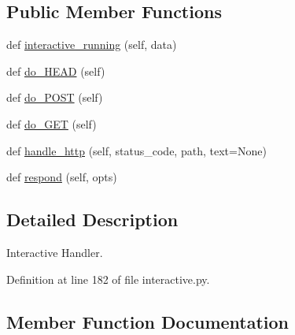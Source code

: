 \subsection*{Public Member Functions}
\begin{DoxyCompactItemize}
\item 
def \hyperlink{classprojects_1_1personality__captions_1_1interactive_1_1MyHandler_ae58a0c4c564f54a29ff85afa26086e47}{interactive\+\_\+running} (self, data)
\item 
def \hyperlink{classprojects_1_1personality__captions_1_1interactive_1_1MyHandler_a51c600da08cf2f01d860f4a4c500e827}{do\+\_\+\+H\+E\+AD} (self)
\item 
def \hyperlink{classprojects_1_1personality__captions_1_1interactive_1_1MyHandler_a846c973c3c91308218b79f84396265ac}{do\+\_\+\+P\+O\+ST} (self)
\item 
def \hyperlink{classprojects_1_1personality__captions_1_1interactive_1_1MyHandler_a52eec9579c85ca0497df9cbe773f729c}{do\+\_\+\+G\+ET} (self)
\item 
def \hyperlink{classprojects_1_1personality__captions_1_1interactive_1_1MyHandler_aa0900ea1f19ecd9cd9bf0ae93ce1028e}{handle\+\_\+http} (self, status\+\_\+code, path, text=None)
\item 
def \hyperlink{classprojects_1_1personality__captions_1_1interactive_1_1MyHandler_a990c770086f0596dde94fc2a84e76d90}{respond} (self, opts)
\end{DoxyCompactItemize}


\subsection{Detailed Description}
\begin{DoxyVerb}Interactive Handler.
\end{DoxyVerb}
 

Definition at line 182 of file interactive.\+py.



\subsection{Member Function Documentation}
\mbox{\label{classprojects_1_1personality__captions_1_1interactive_1_1MyHandler_a52eec9579c85ca0497df9cbe773f729c}} 
